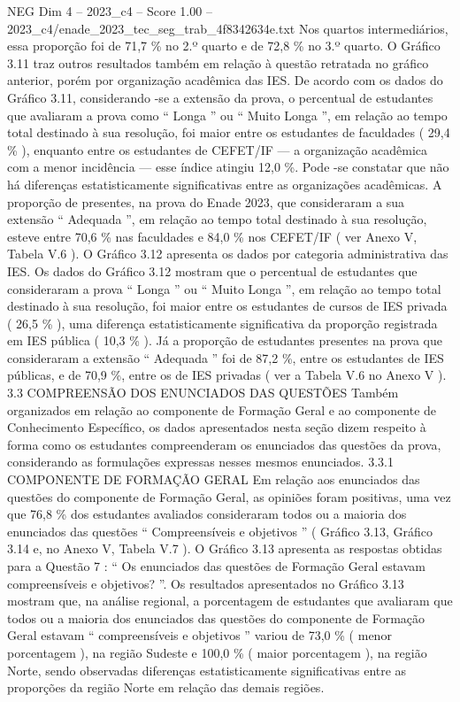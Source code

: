 \begin{textsample}{NEG Dim 4 – 2023\_c4 – Score 1.00 – 2023\_c4/enade\_2023\_tec\_seg\_trab\_4f8342634e.txt}
Nos quartos intermediários, essa proporção foi de 71,7 \% no 2.º quarto e de 72,8 \% no 3.º quarto.
O Gráfico 3.11 traz outros resultados também em relação à questão retratada no gráfico anterior, porém por organização acadêmica das IES.
De acordo com os dados do Gráfico 3.11, considerando -se a extensão da prova, o percentual de estudantes que avaliaram a prova como “ Longa ” ou “ Muito Longa ”, em relação ao tempo total destinado à sua resolução, foi maior entre os estudantes de faculdades ( 29,4 \% ), enquanto entre os estudantes de CEFET/IF — a organização acadêmica com a menor incidência — esse índice atingiu 12,0 \%.
Pode -se constatar que não há diferenças estatisticamente significativas entre as organizações acadêmicas.
A proporção de presentes, na prova do Enade 2023, que consideraram a sua extensão “ Adequada ”, em relação ao tempo total destinado à sua resolução, esteve entre 70,6 \% nas faculdades e 84,0 \% nos CEFET/IF ( ver Anexo V, Tabela V.6 ).
O Gráfico 3.12 apresenta os dados por categoria administrativa das IES.
Os dados do Gráfico 3.12 mostram que o percentual de estudantes que consideraram a prova “ Longa ” ou “ Muito Longa ”, em relação ao tempo total destinado à sua resolução, foi maior entre os estudantes de cursos de IES privada ( 26,5 \% ), uma diferença estatisticamente significativa da proporção registrada em IES pública ( 10,3 \% ).
Já a proporção de estudantes presentes na prova que consideraram a extensão “ Adequada ” foi de 87,2 \%, entre os estudantes de IES públicas, e de 70,9 \%, entre os de IES privadas ( ver a Tabela V.6 no Anexo V ). 3.3 COMPREENSÃO DOS ENUNCIADOS DAS QUESTÕES Também organizados em relação ao componente de Formação Geral e ao componente de Conhecimento Específico, os dados apresentados nesta seção dizem respeito à forma como os estudantes compreenderam os enunciados das questões da prova, considerando as formulações expressas nesses mesmos enunciados. 3.3.1 COMPONENTE DE FORMAÇÃO GERAL Em relação aos enunciados das questões do componente de Formação Geral, as opiniões foram positivas, uma vez que 76,8 \% dos estudantes avaliados consideraram todos ou a maioria dos enunciados das questões “ Compreensíveis e objetivos ” ( Gráfico 3.13, Gráfico 3.14 e, no Anexo V, Tabela V.7 ).
O Gráfico 3.13 apresenta as respostas obtidas para a Questão 7 : “ Os enunciados das questões de Formação Geral estavam compreensíveis e objetivos? ”.
Os resultados apresentados no Gráfico 3.13 mostram que, na análise regional, a porcentagem de estudantes que avaliaram que todos ou a maioria dos enunciados das questões do componente de Formação Geral estavam “ compreensíveis e objetivos ” variou de 73,0 \% ( menor porcentagem ), na região Sudeste e 100,0 \% ( maior porcentagem ), na região Norte, sendo observadas diferenças estatisticamente significativas entre as proporções da região Norte em relação das demais regiões.

\end{textsample}
